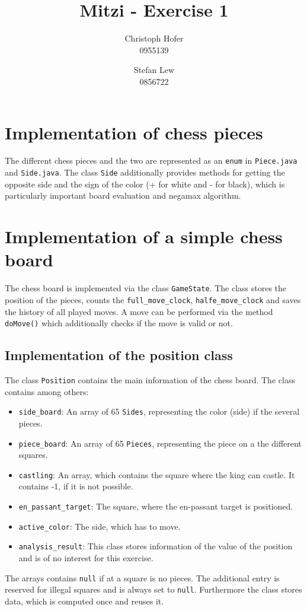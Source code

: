\documentclass [12pt ,a4paper, naustrian]{scrartcl}
\author{Christoph Hofer\\ 0955139 \and Stefan Lew \\ 0856722}
\title{Mitzi - Exercise 1}
\theoremstyle{plain}
\theoremstyle{definition}
\theoremstyle{remark}
\begin{document}
\maketitle
\newpage

\section{Implementation of chess pieces}
	The different chess pieces and the two are represented as an \verb+enum+ in \verb+Piece.java+ and \verb+Side.java+. The class \verb+Side+ additionally provides methods for getting the opposite side and the sign of the color (+ for white and - for black), which is particularly important board evaluation and negamax algorithm.
	
\section{Implementation of a simple chess board}
	The chess board is implemented via the class \verb+GameState+. The class stores the position of the pieces, counts the \verb+full_move_clock+, \verb+halfe_move_clock+ and saves the history of all played moves. A move can be performed via the method \verb+doMove()+ which additionally checks if the move is valid or not.	
	
	\subsection{Implementation of the position class}
		The class \verb+Position+ contains the main information of the chess board. The class contains among others:
		\begin{itemize}
			\item \verb+side_board+: An array of 65 \verb+Sides+, representing the color (side) if the several pieces.
			\item \verb+piece_board+: An array of 65 \verb+Pieces+, representing the piece on a the different squares.
			\item \verb+castling+: An array, which contains the square where the king can castle. It contains -1, if it is not possible.
			\item \verb+en_passant_target+: The square, where the en-passant target is positioned.
			\item \verb+active_color+: The side, which has to move.
			\item \verb+analysis_result+: This class stores information of the value of the position and is of no interest for this exercise.
		\end{itemize}
		The arrays contains \verb+null+ if at a square is no pieces. The additional entry    is reserved for illegal squares and is always set to \verb+null+. Furthermore the class stores data, which is computed once and reuses it.
		
\end{document}
